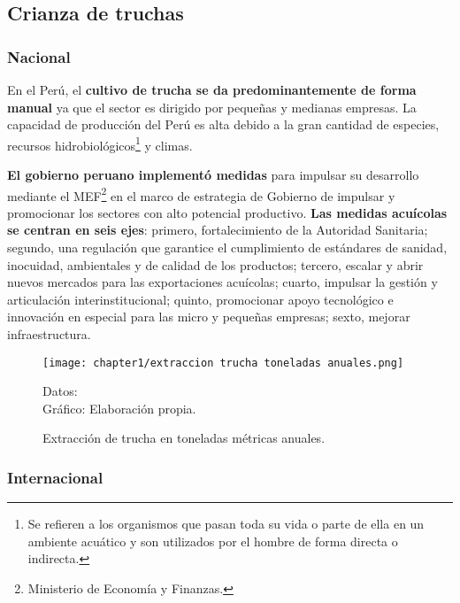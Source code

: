 \subsection{Crianza de truchas}

\subsubsection{Nacional}
En el Perú, el \textbf{cultivo de trucha se da predominantemente de forma manual} ya que el sector es dirigido por pequeñas y medianas empresas. La capacidad de producción del Perú es alta debido a la gran cantidad de especies, recursos hidrobiológicos\footnote{Se refieren a los organismos que pasan toda su vida o parte de ella en un ambiente acuático y son utilizados por el hombre de forma directa o indirecta.\citep{MINAGRI2011}} y climas.

\textbf{El gobierno peruano implementó medidas} para impulsar su desarrollo mediante el MEF\footnote{Ministerio de Economía y Finanzas.}  en el marco de estrategia de Gobierno de impulsar y promocionar los sectores con alto potencial productivo. \textbf{Las medidas acuícolas se centran en seis ejes}: primero, fortalecimiento de la Autoridad Sanitaria; segundo, una regulación que garantice el cumplimiento de estándares de sanidad, inocuidad, ambientales y de calidad de los productos; tercero, escalar y abrir nuevos mercados para las exportaciones acuícolas; cuarto, impulsar la gestión y articulación interinstitucional; quinto, promocionar apoyo tecnológico e innovación en especial para las micro y pequeñas empresas; sexto, mejorar infraestructura. \citep{Andina2019}

\begin{figure}[H]
	\centering
	\texttt{[image: chapter1/extraccion trucha toneladas anuales.png]}
	\caption{Extracción de trucha en toneladas métricas anuales.}
	\begin{myflushleftportland}
		Datos: \citep{MinisteriodelaProducciondelPeru2018} 	 \\ 
		Gráfico: Elaboración propia.
	\end{myflushleftportland}	
	\label{fig:Extracción de trucha en toneladas métricas anuales}
\end{figure}

\subsubsection{Internacional}

